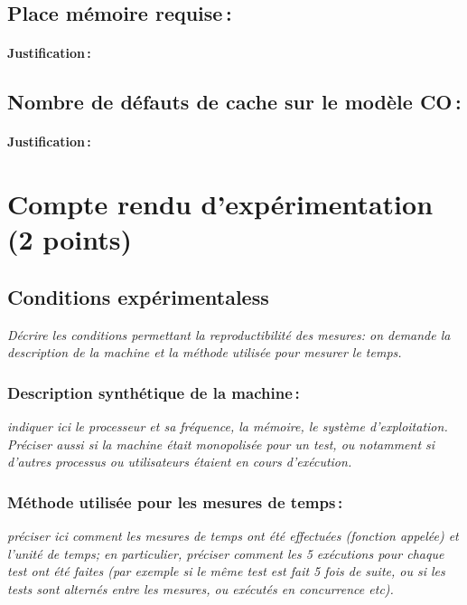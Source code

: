 \documentclass[a4paper, 10pt, french]{article}
\begin{document}
  \subsection{Place mémoire requise\,: }
    \paragraph{Justification\,: }

  \subsection{Nombre de défauts de cache sur le modèle CO\,: }
    \paragraph{Justification\,: }


\section{Compte rendu d'expérimentation (2 points)}
  \subsection{Conditions expérimentaless}
     {\em Décrire les conditions permettant la reproductibilité des mesures: on demande la description
      de la machine et la méthode utilisée pour mesurer le temps.
     }

    \subsubsection{Description synthétique de la machine\,:} 
      {\em indiquer ici le  processeur et sa fréquence, la mémoire, le système d'exploitation. 
       Préciser aussi si la machine était monopolisée pour un test, ou notamment si 
       d'autres processus ou utilisateurs étaient en cours d'exécution. 
      } 

    \subsubsection{Méthode utilisée pour les mesures de temps\,: } 
      {\em préciser ici  comment les mesures de temps ont été effectuées (fonction appelée) et l'unité de temps; en particulier, 
       préciser comment les 5 exécutions pour chaque test ont été faites (par exemple si le même test est fait 5 fois de suite, ou si les tests sont alternés entre
       les mesures, ou exécutés en concurrence etc). 
      }
\end{document}
